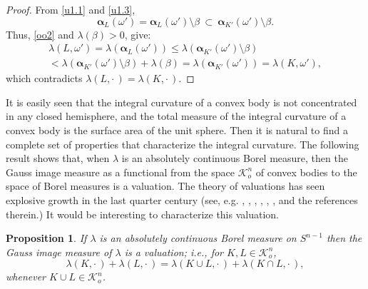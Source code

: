 \documentclass{cpamart1}     %
\newtheorem{prop}[theo]{Proposition}
\theoremstyle{definition}
\theoremstyle{remark}
\newcommand{\sn}{S^{n-1}}
\newcommand{\kno}{\mathcal K^n_o}
\newcommand{\balpha}{\pmb{\alpha}}
\begin{document}
\begin{proof}
From \eqref{u1.1} and \eqref{u1.3},
\begin{equation}\label{oo2}
\balpha_{L}(\omega') = \balpha_{L}(\omega')\setminus\beta\  \subset\
\balpha_{K'}(\omega')\setminus\beta.
\end{equation}
Thus, \eqref{oo2} and $\lambda(\beta)>0$, give:
\begin{multline*}
\lambda(L,\omega')=\lambda(\balpha_{L}(\omega'))
\le \lambda(\balpha_{K'}(\omega')\setminus\beta)\\
< \lambda(\balpha_{K'}(\omega')\setminus\beta)  + \lambda(\beta)
= \lambda(\balpha_{K'}(\omega')) =\lambda(K,\omega'),
\end{multline*}
which contradicts $\lambda(L,\cdot\,) = \lambda(K,\cdot\,)$.
\end{proof}










It is easily seen that the integral curvature of a convex body is
not concentrated in any closed
hemisphere, and the total measure of the integral curvature of a convex body
is the surface area of the unit sphere. Then it is natural to find a complete set
of properties that characterize the integral curvature. The following result
shows that, when $\lambda$ is an absolutely continuous Borel measure, then
the Gauss image measure as a functional from the space $\kno$ of convex bodies
to the space of Borel measures is a valuation. The theory of valuations has seen
explosive growth in the last quarter century (see, e.g. \cite{A99ann, A04gafa, ABS11gafa}, \cite{BL19jems}, 
\cite{H12}, \cite{HP14JAMS}, \cite{Lud03, Lud04, Lud10, LR10annals},
\cite{S10duke, SW15ajm, SW16jems},
and the references therein.)
It would be interesting to characterize this valuation.






\begin{prop}\label{va}
If $\lambda$ is an absolutely continuous Borel measure on $\sn$ then the Gauss image measure of $\lambda$ is a
valuation; i.e., for $K, L \in \kno$,
\[
\lambda(K,\cdot\,) + \lambda(L,\cdot\,) =\lambda(K\cup L,\cdot\,) + \lambda(K\cap L,\cdot\,),
\]
whenever $K\cup L\in \kno$.
\end{prop}
\end{document}
